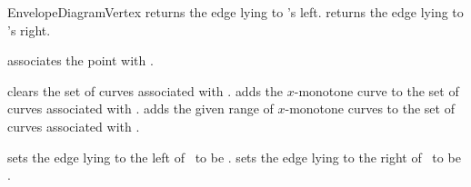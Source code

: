 \begin{ccRefConcept}{EnvelopeDiagramVertex}
    {returns the edge lying to \ccVar's left.}
\ccGlue
{}
    {returns the edge lying to \ccVar's right.}

\ccModifiers

    {associates the point  with \ccVar.}

    {clears the set of curves associated with \ccVar.}
\ccGlue
{}
    {adds the $x$-monotone curve  to the set of curves associated with \ccVar.}
\ccGlue
{}
    {adds the given range of $x$-monotone curves to the set of curves associated with \ccVar.}

    {sets the edge lying to the left of \ccVar\ to be .}
\ccGlue
{}
    {sets the edge lying to the right of \ccVar\ to be .}

\ccSeeAlso
     \\
     \\

\end{ccRefConcept}

\ccRefPageEnd

